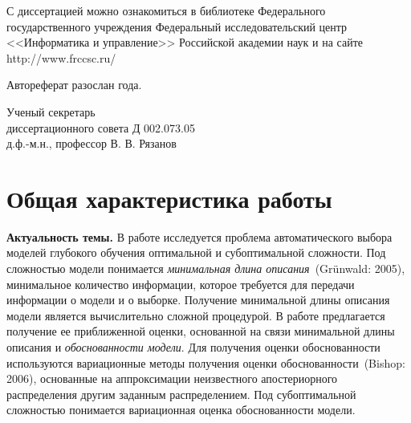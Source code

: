 \documentclass[11pt, a5paper]{dissert}
\theoremstyle{definition}
\begin{document}
{\vspace{0.2cm}
\noindent С диссертацией можно ознакомиться в библиотеке Федерального государственного учреждения Федеральный исследовательский центр <<Информатика и управление>> Российской академии наук и на сайте http://www.frccsc.ru/

\vspace{0.2cm}
\noindent Автореферат разослан  \quad {} года.

\vspace{0.3cm}
\noindent Ученый секретарь\\
диссертационного совета Д 002.073.05\\
д.ф.-м.н., профессор
\hspace{9cm} В. В. Рязанов
}

\clearpage





\section*{Общая характеристика работы}
\label{ch:Introduction}

\textbf{Актуальность темы.}
В работе исследуется проблема автоматического выбора моделей глубокого обучения оптимальной и субоптимальной сложности. 
Под сложностью модели понимается \emph{минимальная длина описания}~(Gr{\"u}nwald: 2005),  минимальное количество информации, которое требуется для передачи информации о модели и о выборке. Получение минимальной длины описания модели является вычислительно сложной процедурой. В работе предлагается получение ее приближенной оценки, основанной на связи минимальной длины описания и \emph{обоснованности модели}. Для получения оценки обоснованности используются вариационные методы получения оценки обоснованности~(Bishop: 2006), основанные на аппроксимации неизвестного апостериорного распределения другим заданным распределением. Под субоптимальной сложностью понимается вариационная оценка обоснованности модели.
\end{document}
